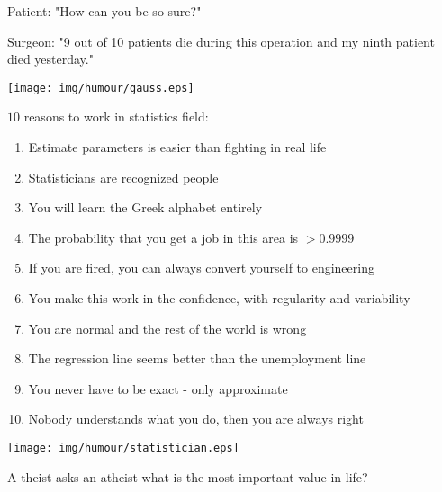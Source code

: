 Patient: "How can you be so sure?"

Surgeon: "9 out of 10 patients die during this operation and my ninth patient died yesterday."
\begin{center}\underline{\hspace{5 cm}}\end{center}
	\begin{center}
	\texttt{[image: img/humour/gauss.eps]}
	\end{center}

\pagebreak
$10$ reasons to work in statistics field:
\begin{enumerate}
	\item Estimate parameters is easier than fighting in real life

	\item Statisticians are recognized people

	\item You will learn the Greek alphabet entirely

	\item The probability that you get a job in this area is $> 0.9999$

	\item If you are fired, you can always convert yourself to engineering

	\item You make this work in the confidence, with regularity and variability

	\item You are normal and the rest of the world is wrong

	\item The regression line seems better than the unemployment line

	\item You never have to be exact - only approximate

	\item Nobody understands what you do, then you are always right
\end{enumerate} 

	\begin{center}\underline{\hspace{5 cm}}\end{center}
	\begin{center}
	\texttt{[image: img/humour/statistician.eps]}
	\end{center}
	
	\begin{center}\underline{\hspace{5 cm}}\end{center}	
	A theist asks an atheist what is the most important value in life?

